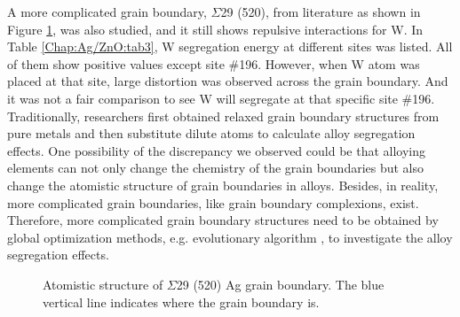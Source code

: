 A more complicated grain boundary, $\Sigma$29 (520), from literature \cite{zhu2018predicting} as shown in Figure \ref{Chap:Ag/ZnO:fig20}, was also studied, and it still shows repulsive interactions for W. In Table \ref{Chap:Ag/ZnO:tab3}, W segregation energy at different sites was listed. All of them show positive values except site \#196. However, when W atom was placed at that site, large distortion was observed across the grain boundary. And it was not a fair comparison to see W will segregate at that specific site \#196. Traditionally, researchers first obtained relaxed grain boundary structures from pure metals and then substitute dilute atoms to calculate alloy segregation effects. One possibility of the discrepancy we observed could be that alloying elements can not only change the chemistry of the grain boundaries but also change the atomistic structure of grain boundaries in alloys. Besides, in reality, more complicated grain boundaries, like grain boundary complexions, exist\cite{cantwell2014grain}. Therefore, more complicated grain boundary structures need to be obtained by global optimization methods, e.g. evolutionary algorithm \cite{yang2020grain}, to investigate the alloy segregation effects.


\begingroup
\begin{figure}[!ht]
  \centering
  \caption[Atomistic structure of $\Sigma$29 (520) Ag grain boundary.]{Atomistic structure of $\Sigma$29 (520) Ag grain boundary. The blue vertical line indicates where the grain boundary is.}
  \label{Chap:Ag/ZnO:fig20}
\end{figure}
\endgroup

